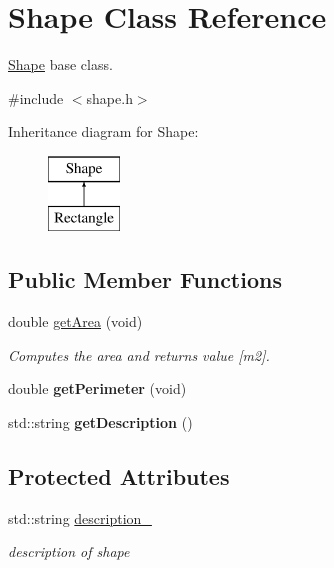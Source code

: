 \hypertarget{classShape}{}\section{Shape Class Reference}
\label{classShape}


\hyperlink{classShape}{Shape} base class.  




{\ttfamily \#include $<$shape.\+h$>$}

Inheritance diagram for Shape\+:\begin{figure}[H]
\begin{center}
\leavevmode
\includegraphics[height=2.000000cm]{classShape}
\end{center}
\end{figure}
\subsection*{Public Member Functions}
\begin{DoxyCompactItemize}
\item 
double \hyperlink{classShape_a979c49fdf29dde347a2e83f779ca78bd}{get\+Area} (void)
\begin{DoxyCompactList}\small\item\em Computes the area and returns value \mbox{[}m2\mbox{]}. \end{DoxyCompactList}\item 
double {\bfseries get\+Perimeter} (void)\hypertarget{classShape_aeaeb4227da008cd7491691b2f3d89292}{}\label{classShape_aeaeb4227da008cd7491691b2f3d89292}

\item 
std\+::string {\bfseries get\+Description} ()\hypertarget{classShape_a8bedf1ca522a2d0280a52d819cb55bf8}{}\label{classShape_a8bedf1ca522a2d0280a52d819cb55bf8}

\end{DoxyCompactItemize}
\subsection*{Protected Attributes}
\begin{DoxyCompactItemize}
\item 
std\+::string \hyperlink{classShape_a67e9566e302b377f2a6d2032fdad48e2}{description\+\_\+}\hypertarget{classShape_a67e9566e302b377f2a6d2032fdad48e2}{}\label{classShape_a67e9566e302b377f2a6d2032fdad48e2}

\begin{DoxyCompactList}\small\item\em description of shape \end{DoxyCompactList}\end{DoxyCompactItemize}


